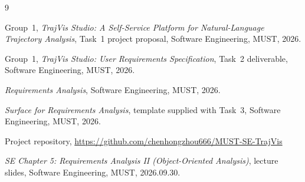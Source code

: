 \documentclass[12pt,a4paper]{report}
\begin{document}
\begin{thebibliography}{9}

 Group~1, \emph{TrajVis Studio: A Self-Service Platform for
  Natural-Language Trajectory Analysis}, Task~1 project proposal, Software
  Engineering, MUST, 2026.

 Group~1, \emph{TrajVis Studio: User Requirements
  Specification}, Task~2 deliverable, Software Engineering, MUST, 2026.

 \emph{Requirements Analysis}, Software Engineering,
  MUST, 2026.

 \emph{Surface for Requirements Analysis}, template
  supplied with Task~3, Software Engineering, MUST, 2026.

 Project repository,
  \url{https://github.com/chenhongzhou666/MUST-SE-TrajVis}

 \emph{SE Chapter 5: Requirements Analysis II (Object-Oriented
  Analysis)}, lecture slides, Software Engineering, MUST, 2026.09.30.

\end{thebibliography}
\end{document}

